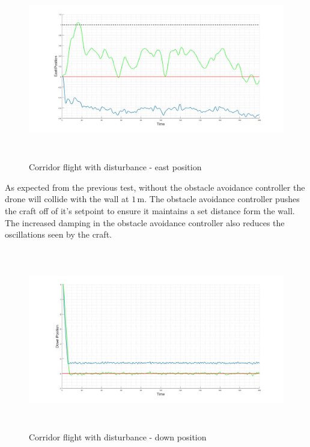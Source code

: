 		\begin{figure}[H]
			\centering
			\includegraphics[height = 7.9cm]{../References/Testing/CorridorFlight_2Wind_East.jpg}     
			\caption{Corridor flight with disturbance - east position}
			\label{IM_Test23}
		\end{figure}
		
		As expected from the previous test, without the obstacle avoidance controller the drone will collide with the wall at $1$\,m. The obstacle avoidance controller pushes the craft off of it's setpoint to ensure it maintains a set distance form the wall. The increased damping in the obstacle avoidance controller also reduces the oscillations seen by the craft.
		
		\begin{figure}[H]
			\centering
			\includegraphics[height = 7.9cm]{../References/Testing/CorridorFlight_2Wind_Down.jpg}     
			\caption{Corridor flight with disturbance - down position}
			\label{IM_Test24}
		\end{figure}
		
